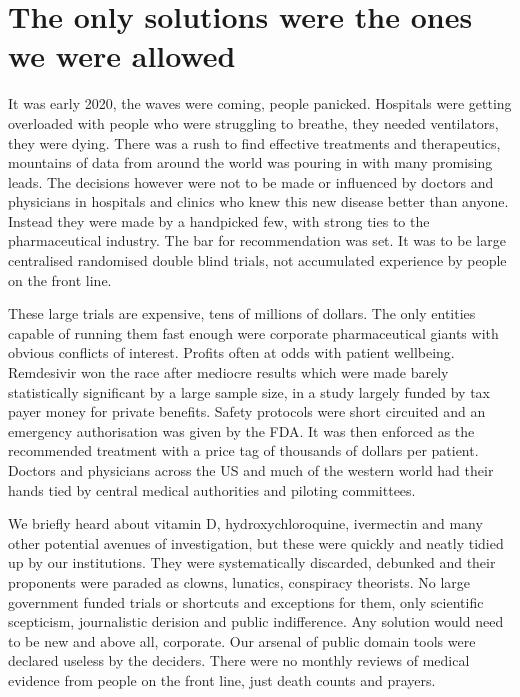 \documentclass[11pt,a4paper]{article}
\begin{document}
\section*{The only solutions were the ones we were allowed}

It was early 2020, the waves were coming, people panicked. Hospitals were getting overloaded with people who were struggling to breathe, they needed ventilators, they were dying. There was a rush to find effective treatments and therapeutics, mountains of data from around the world was pouring in with many promising leads. The decisions however were not to be made or influenced by doctors and physicians in hospitals and clinics who knew this new disease better than anyone. Instead they were made by a handpicked few, with strong ties to the pharmaceutical industry. The bar for recommendation was set. It was to be large centralised randomised double blind trials, not accumulated experience by people on the front line.

These large trials are expensive, tens of millions of dollars. The only entities capable of running them  fast enough were corporate pharmaceutical giants with obvious conflicts of interest. Profits often at odds with patient wellbeing. Remdesivir won the race after mediocre results which were made barely statistically significant by a large sample size, in a study largely funded by tax payer money for private benefits. Safety protocols were short circuited and an emergency authorisation was given by the FDA. It was then enforced as the recommended treatment with a price tag of thousands of dollars per patient. Doctors and physicians across the US and much of the western world had their hands tied by central medical authorities and piloting committees. 

We briefly heard about vitamin D, hydroxychloroquine, ivermectin and many other potential avenues of investigation, but these were quickly and neatly tidied up by our institutions. They were systematically discarded, debunked and their proponents were paraded as clowns, lunatics, conspiracy theorists. No large government funded trials or shortcuts and exceptions for them, only scientific scepticism, journalistic derision and public indifference. Any solution would need to be new and above all, corporate. Our arsenal of public domain tools were declared useless by the deciders. There were no monthly reviews of medical evidence from people on the front line, just death counts and prayers.
\end{document}
